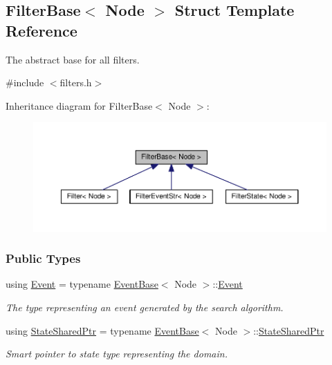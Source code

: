 \hypertarget{structFilterBase}{}\subsection{Filter\+Base$<$ Node $>$ Struct Template Reference}
\label{structFilterBase}


The abstract base for all filters.  




{\ttfamily \#include $<$filters.\+h$>$}



Inheritance diagram for Filter\+Base$<$ Node $>$\+:\nopagebreak
\begin{figure}[H]
\begin{center}
\leavevmode
\includegraphics[width=350pt]{structFilterBase__inherit__graph}
\end{center}
\end{figure}
\subsubsection*{Public Types}
\begin{DoxyCompactItemize}
\item 
using \hyperlink{structFilterBase_a78af2a738ffab6c352d6c4ad0d148a01}{Event} = typename \hyperlink{structEventBase}{Event\+Base}$<$ Node $>$\+::\hyperlink{structFilterBase_a78af2a738ffab6c352d6c4ad0d148a01}{Event}\hypertarget{structFilterBase_a78af2a738ffab6c352d6c4ad0d148a01}{}\label{structFilterBase_a78af2a738ffab6c352d6c4ad0d148a01}

\begin{DoxyCompactList}\small\item\em The type representing an event generated by the search algorithm. \end{DoxyCompactList}\item 
using \hyperlink{structFilterBase_a35be487b0359aa9af7acfa557f4f6e88}{State\+Shared\+Ptr} = typename \hyperlink{structEventBase}{Event\+Base}$<$ Node $>$\+::\hyperlink{structFilterBase_a35be487b0359aa9af7acfa557f4f6e88}{State\+Shared\+Ptr}\hypertarget{structFilterBase_a35be487b0359aa9af7acfa557f4f6e88}{}\label{structFilterBase_a35be487b0359aa9af7acfa557f4f6e88}

\begin{DoxyCompactList}\small\item\em Smart pointer to state type representing the domain. \end{DoxyCompactList}\end{DoxyCompactItemize}
